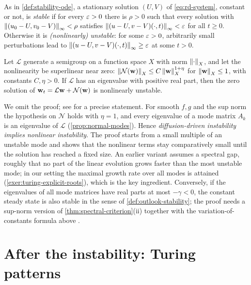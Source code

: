 \begin{definition}\label{def:outlook-stability}
As in \cref{def:stability-ode}, a stationary solution $(U,V)$ of \eqref{eq:rd-system},
constant or not, is \emph{stable} if for every $\varepsilon>0$ there is $\rho>0$ such that
every solution with $\left\lVert (u_0-U,v_0-V)\right\rVert_\infty<\rho$ satisfies
$\left\lVert (u-U,v-V)(\cdot,t)\right\rVert_\infty<\varepsilon$ for all $t\ge0$. Otherwise it is
\emph{(nonlinearly) unstable}: for some $\varepsilon>0$, arbitrarily small perturbations
lead to $\left\lVert (u-U,v-V)(\cdot,t)\right\rVert_\infty\ge\varepsilon$ at some $t>0$.
\end{definition}

\begin{theorem}\label{thm:nonlinear-instability}
Let $\mathcal L$ generate a semigroup on a function space $X$ with norm
$\left\lVert \cdot\right\rVert_X$, and let the nonlinearity be superlinear near zero: $\left\lVert \mathcal
N(\mathbf{w})\right\rVert_X\le C\left\lVert \mathbf{w}\right\rVert_X^{1+\eta}$ for $\left\lVert \mathbf{w}\right\rVert_X\le1$, with constants
$C,\eta>0$. If $\mathcal L$ has an eigenvalue with positive real part, then the zero
solution of $\mathbf{w}_t=\mathcal L\mathbf{w}+\mathcal N(\mathbf{w})$ is nonlinearly unstable.
\end{theorem}

We omit the proof; see \cite{ShatahStrauss2000} for a precise statement. For smooth
$f,g$ and the sup norm the hypothesis on $\mathcal N$ holds with $\eta=1$, and every
eigenvalue of a mode matrix $A_k$ is an eigenvalue of $\mathcal L$
(\cref{prop:normal-modes}). Hence \emph{diffusion-driven instability implies
nonlinear instability}. The proof starts from a small multiple of an unstable mode
and shows that the nonlinear terms stay comparatively small until the solution has
reached a fixed size. An earlier variant \cite{FriedlanderStraussVishik1997} assumes
a spectral gap, roughly that no part of the linear evolution grows faster than the
most unstable mode; in our setting the maximal growth rate over all modes is
attained (\cref{exer:turing-explicit-roots}), which is the key ingredient.
Conversely, if the eigenvalues of all mode matrices have real parts at most
$-\gamma<0$, the constant steady state is also stable in the sense of
\cref{def:outlook-stability}; the proof needs a sup-norm version of
\cref{thm:spectral-criterion}(ii) together with the variation-of-constants formula
above \cite{Henry1981}.

\section{After the instability: Turing patterns}\label{sec:outlook-patterns}

